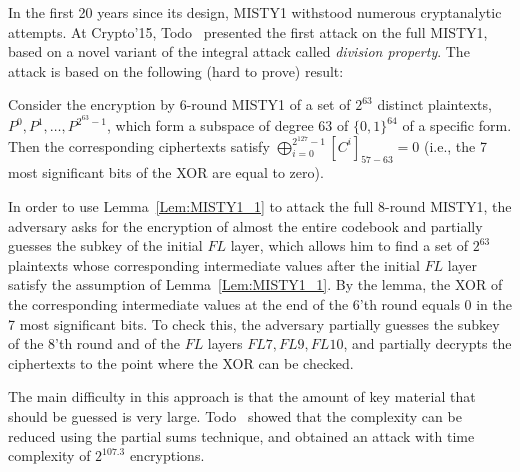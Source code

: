 In the first 20 years since its design, MISTY1 withstood numerous cryptanalytic attempts. At Crypto'15, Todo~\cite{C:Todo15} presented the first attack on the full MISTY1, based on a novel variant of the integral attack called \emph{division property}. The attack is based on the following (hard to prove) result: 
\begin{lemma}\label{Lem:MISTY1_1}
Consider the encryption by 6-round MISTY1 of a set of $2^{63}$ distinct plaintexts, $P^0,P^1,\ldots,P^{2^{63}-1}$, which form a subspace of degree 63 of $\{0,1\}^{64}$ of a specific form. Then the corresponding ciphertexts satisfy $\bigoplus_{i=0}^{2^{127}-1} [C^i]_{57-63}=0$ (i.e., the 7 most significant bits of the XOR are equal to zero).  
\end{lemma}
In order to use Lemma~\ref{Lem:MISTY1_1} to attack the full 8-round MISTY1, the adversary asks for the encryption of almost the entire codebook and partially guesses the subkey of the initial $FL$ layer, which allows him to find a set of $2^{63}$ plaintexts whose corresponding intermediate values after the initial $FL$ layer satisfy the assumption of Lemma~\ref{Lem:MISTY1_1}. By the lemma, the XOR of the corresponding intermediate values at the end of the 6'th round equals 0 in the 7 most significant bits. To check this, the adversary partially guesses the subkey of the 8'th round and of the $FL$ layers $FL7,FL9,FL10$, and partially decrypts the ciphertexts to the point where the XOR can be checked. 

The main difficulty in this approach is that the amount of key material that should be guessed is very large. Todo~\cite{C:Todo15} showed that the complexity can be reduced using the partial sums technique, and obtained an attack with time complexity of $2^{107.3}$ encryptions. 

